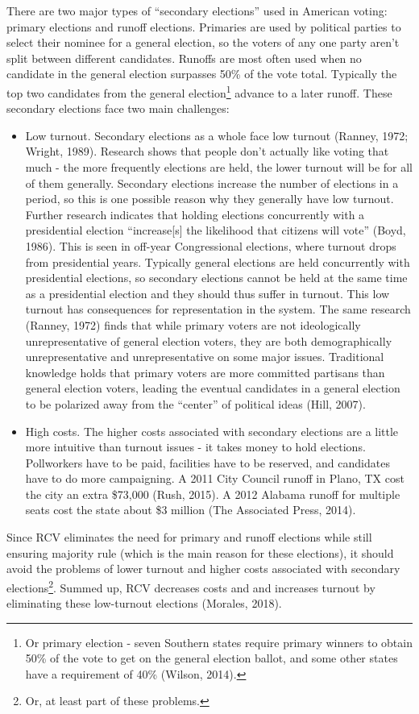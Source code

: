 \documentclass[12pt,twoside]{reedthesis}
\begin{document}
There are two major types of ``secondary elections'' used in American voting: primary elections and runoff elections. Primaries are used by political parties to select their nominee for a general election, so the voters of any one party aren't split between different candidates. Runoffs are most often used when no candidate in the general election surpasses 50\% of the vote total. Typically the top two candidates from the general election\footnote{Or primary election - seven Southern states require primary winners to obtain 50\% of the vote to get on the general election ballot, and some other states have a requirement of 40\% (Wilson, 2014).} advance to a later runoff. These secondary elections face two main challenges:
\begin{itemize}
\item
  Low turnout. Secondary elections as a whole face low turnout (Ranney, 1972; Wright, 1989). Research shows that people don't actually like voting that much - the more frequently elections are held, the lower turnout will be for all of them generally. Secondary elections increase the number of elections in a period, so this is one possible reason why they generally have low turnout. Further research indicates that holding elections concurrently with a presidential election ``increase{[}s{]} the likelihood that citizens will vote'' (Boyd, 1986). This is seen in off-year Congressional elections, where turnout drops from presidential years. Typically general elections are held concurrently with presidential elections, so secondary elections cannot be held at the same time as a presidential election and they should thus suffer in turnout. This low turnout has consequences for representation in the system. The same research (Ranney, 1972) finds that while primary voters are not ideologically unrepresentative of general election voters, they are both demographically unrepresentative and unrepresentative on some major issues. Traditional knowledge holds that primary voters are more committed partisans than general election voters, leading the eventual candidates in a general election to be polarized away from the ``center'' of political ideas (Hill, 2007).
\item
  High costs. The higher costs associated with secondary elections are a little more intuitive than turnout issues - it takes money to hold elections. Pollworkers have to be paid, facilities have to be reserved, and candidates have to do more campaigning. A 2011 City Council runoff in Plano, TX cost the city an extra \$73,000 (Rush, 2015). A 2012 Alabama runoff for multiple seats cost the state about \$3 million (The Associated Press, 2014).
\end{itemize}
Since RCV eliminates the need for primary and runoff elections while still ensuring majority rule (which is the main reason for these elections), it should avoid the problems of lower turnout and higher costs associated with secondary elections\footnote{Or, at least part of these problems.}. Summed up, RCV decreases costs and and increases turnout by eliminating these low-turnout elections (Morales, 2018).
\end{document}
